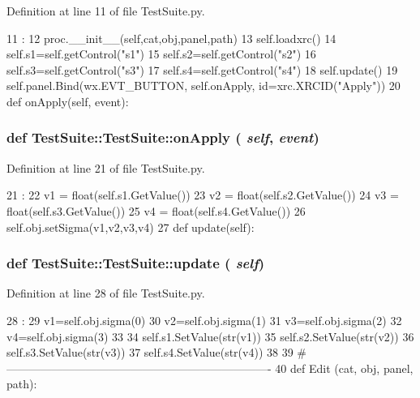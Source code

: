 Definition at line 11 of file TestSuite.py.


\begin{DoxyCode}
11                                              :
12         proc.__init__(self,cat,obj,panel,path)
13         self.loadxrc()
14         self.s1=self.getControl("s1")
15         self.s2=self.getControl("s2")
16         self.s3=self.getControl("s3")
17         self.s4=self.getControl("s4")
18         self.update()
19         self.panel.Bind(wx.EVT_BUTTON, self.onApply, id=xrc.XRCID("Apply"))
20 
    def onApply(self, event):
\end{DoxyCode}
\hypertarget{classTestSuite_1_1TestSuite_a80b48e10e265f0bee62ae672364621a6}{
\subsubsection[{onApply}]{\setlength{\rightskip}{0pt plus 5cm}def TestSuite::TestSuite::onApply ( {\em self}, \/   {\em event})}}
\label{classTestSuite_1_1TestSuite_a80b48e10e265f0bee62ae672364621a6}


Definition at line 21 of file TestSuite.py.


\begin{DoxyCode}
21                             :
22         v1 = float(self.s1.GetValue())
23         v2 = float(self.s2.GetValue())
24         v3 = float(self.s3.GetValue())
25         v4 = float(self.s4.GetValue())
26         self.obj.setSigma(v1,v2,v3,v4)
27 
    def update(self):
\end{DoxyCode}
\hypertarget{classTestSuite_1_1TestSuite_ac971f21027b51f6266bf1ffe875781d2}{
\subsubsection[{update}]{\setlength{\rightskip}{0pt plus 5cm}def TestSuite::TestSuite::update ( {\em self})}}
\label{classTestSuite_1_1TestSuite_ac971f21027b51f6266bf1ffe875781d2}


Definition at line 28 of file TestSuite.py.


\begin{DoxyCode}
28                     :
29         v1=self.obj.sigma(0)
30         v2=self.obj.sigma(1)
31         v3=self.obj.sigma(2)
32         v4=self.obj.sigma(3)
33 
34         self.s1.SetValue(str(v1))
35         self.s2.SetValue(str(v2))
36         self.s3.SetValue(str(v3))
37         self.s4.SetValue(str(v4))        
38 
39 #----------------------------------------------------------------------
40 
def Edit (cat, obj, panel, path):
\end{DoxyCode}


